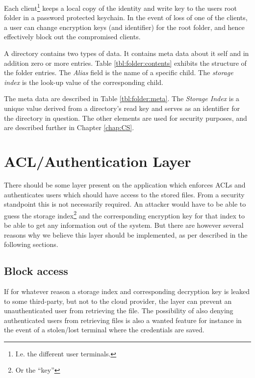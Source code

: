 \documentclass[pdftex,english,10pt,b5paper,twoside]{book}
\begin{document}
Each client\footnote{I.e. the different user terminals.} keeps a local copy of
the identity and write key to the users root folder in a password
protected keychain. In the event of loss of one of the clients, a user can change
encryption keys (and identifier) for the root folder, and hence effectively
block out the compromised clients.



A directory contains two types of data. It contains meta data about it self and
in addition zero or more entries. Table \ref{tbl:folder:contents} exhibits the
structure of the folder entries. The \emph{Alias} field is the name of a
specific child. The \emph{storage index} is the look-up value of the
corresponding child.

The meta data are described in Table \ref{tbl:folder:meta}. The \emph{Storage
Index} is a unique value derived from a directory's read key and serves as an
identifier for the directory in question. The other elements are used for
security purposes, and are described further in Chapter \ref{chap:CS}.



\section{ACL/Authentication Layer}

There should be some layer present on the application which enforces \ac{ACL}s
and authenticates users which should have access to the stored files. From a
security standpoint this is not necessarily required. An attacker would have to
be able to guess the storage index\footnote{Or the ``key''} and the
corresponding encryption key for that index to be able to get any information
out of the system. But there are however several reasons why we believe this
layer should be implemented, as per described in the following sections.

\subsection{Block access}
If for whatever reason a storage index and corresponding decryption key is
leaked to some third-party, but not to the cloud provider, the layer can
prevent an unauthenticated user from retrieving the file. The possibility of
also denying authenticated users from retrieving files is also a wanted feature
for instance in the event of a stolen/lost terminal where the credentials are
saved.
\end{document}
